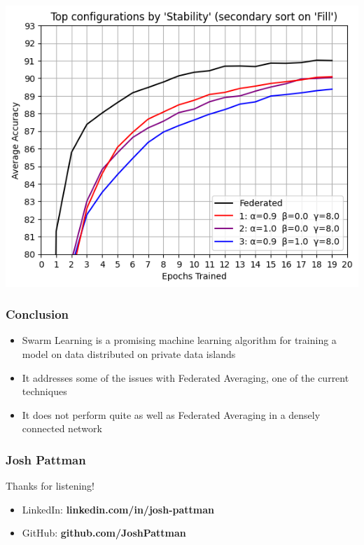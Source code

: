 \documentclass{beamer}
\begin{document}
	\begin{frame}
		\includegraphics[width = \textwidth]{stability_zoom}
	\end{frame}


	\begin{frame}
		\frametitle{Conclusion}
		\begin{itemize}
			\item Swarm Learning is a promising machine learning algorithm for training a model on data distributed on private data islands
			\item It addresses some of the issues with Federated Averaging, one of the current techniques
			\item It does not perform quite as well as Federated Averaging in a densely connected network
		\end{itemize}
	\end{frame}

	\begin{frame}
		\frametitle{Josh Pattman}
		Thanks for listening!
		\begin{itemize}
			\item LinkedIn: \textbf{linkedin.com/in/josh-pattman}
			\item GitHub: \textbf{github.com/JoshPattman}
		\end{itemize}
	\end{frame}
	
\end{document}
